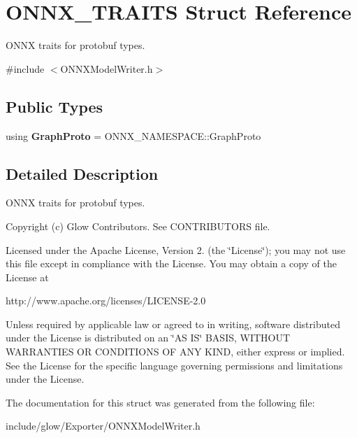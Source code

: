 \hypertarget{struct_o_n_n_x___t_r_a_i_t_s}{}\section{O\+N\+N\+X\+\_\+\+T\+R\+A\+I\+TS Struct Reference}
\label{struct_o_n_n_x___t_r_a_i_t_s}


O\+N\+NX traits for protobuf types.  




{\ttfamily \#include $<$O\+N\+N\+X\+Model\+Writer.\+h$>$}

\subsection*{Public Types}
\begin{DoxyCompactItemize}
\item 
\mbox{\label{struct_o_n_n_x___t_r_a_i_t_s_a984fc4ff5e559b8388996cf486d0c825}} 
using {\bfseries Graph\+Proto} = O\+N\+N\+X\+\_\+\+N\+A\+M\+E\+S\+P\+A\+C\+E\+::\+Graph\+Proto
\end{DoxyCompactItemize}


\subsection{Detailed Description}
O\+N\+NX traits for protobuf types. 

Copyright (c) Glow Contributors. See C\+O\+N\+T\+R\+I\+B\+U\+T\+O\+RS file.

Licensed under the Apache License, Version 2. (the \char`\"{}\+License\char`\"{}); you may not use this file except in compliance with the License. You may obtain a copy of the License at \begin{DoxyVerb}http://www.apache.org/licenses/LICENSE-2.0
\end{DoxyVerb}


Unless required by applicable law or agreed to in writing, software distributed under the License is distributed on an \char`\"{}\+A\+S I\+S\char`\"{} B\+A\+S\+IS, W\+I\+T\+H\+O\+UT W\+A\+R\+R\+A\+N\+T\+I\+ES OR C\+O\+N\+D\+I\+T\+I\+O\+NS OF A\+NY K\+I\+ND, either express or implied. See the License for the specific language governing permissions and limitations under the License. 

The documentation for this struct was generated from the following file\+:\begin{DoxyCompactItemize}
\item 
include/glow/\+Exporter/O\+N\+N\+X\+Model\+Writer.\+h\end{DoxyCompactItemize}
